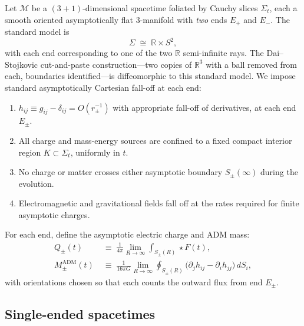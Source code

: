 \documentclass[aps,prd,onecolumn,nofootinbib,superscriptaddress]{revtex4-2}
\begin{document}
Let $\mathcal{M}$ be a $(3+1)$-dimensional spacetime foliated by Cauchy slices
$\Sigma_t$, each a smooth oriented asymptotically flat 3-manifold with
\emph{two} ends $E_+$ and $E_-$.  The standard model is
\begin{equation}
  \Sigma \;\cong\; \mathbb{R}\times S^2,
\end{equation}
with each end corresponding to one of the two $\mathbb{R}$ semi-infinite rays.
The Dai--Stojkovic cut-and-paste construction---two copies of $\mathbb{R}^3$
with a ball removed from each, boundaries identified---is diffeomorphic to this
standard model.  We impose standard asymptotically Cartesian fall-off at each
end:
\begin{enumerate}
  \item $h_{ij} \equiv g_{ij}-\delta_{ij} = O(r_\pm^{-1})$ with appropriate
    fall-off of derivatives, at each end $E_\pm$.
  \item All charge and mass-energy sources are confined to a fixed compact
    interior region $K\subset\Sigma_t$, uniformly in $t$.
  \item No charge or matter crosses either asymptotic boundary
    $S_\pm(\infty)$ during the evolution.
  \item Electromagnetic and gravitational fields fall off at the rates required
    for finite asymptotic charges.\cite{ArnowittDeserMisner1962Dynamics,ReggeTeitelboim1974SurfaceIntegrals}
\end{enumerate}

For each end, define the asymptotic electric charge and ADM mass:
\begin{align}
  Q_\pm(t) &\;\equiv\;
    \frac{1}{4\pi}\lim_{R\to\infty}\int_{S_\pm(R)}\star F(t),
    \label{eq:Qpm-def}\\
  M_\pm^{\mathrm{ADM}}(t) &\;\equiv\;
    \frac{1}{16\pi G}\lim_{R\to\infty}
    \oint_{S_\pm(R)}\!\big(\partial_j h_{ij}-\partial_i h_{jj}\big)\,dS_i,
    \label{eq:Mpm-def}
\end{align}
with orientations chosen so that each counts the outward flux from end $E_\pm$.

\subsection{Single-ended spacetimes}
\end{document}
